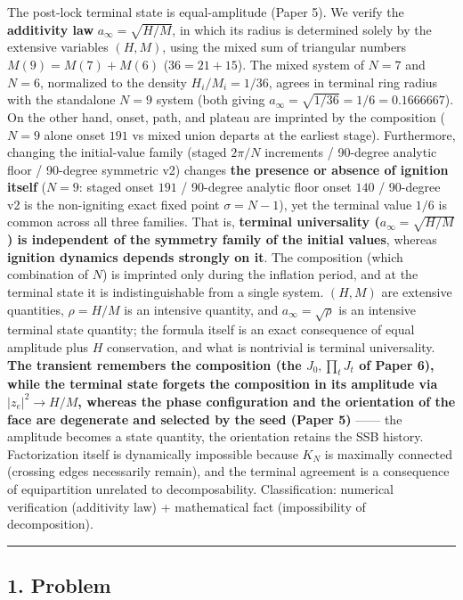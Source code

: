\documentclass[
  a4paper,
]{ltjsarticle}
\begin{document}
The post-lock terminal state is equal-amplitude (Paper 5). We verify the
\textbf{additivity law} \(a_\infty=\sqrt{H/M}\), in which its radius is
determined solely by the extensive variables \((H,M)\), using the mixed
sum of triangular numbers \(M(9)=M(7)+M(6)\) (\(36=21+15\)). The mixed
system of \(N=7\) and \(N=6\), normalized to the density
\(H_i/M_i=1/36\), agrees in terminal ring radius with the standalone
\(N=9\) system (both giving \(a_\infty=\sqrt{1/36}=1/6=0.1666667\)). On
the other hand, onset, path, and plateau are imprinted by the
composition (\(N=9\) alone onset \(191\) vs mixed union departs at the
earliest stage). Furthermore, changing the initial-value family (staged
\(2\pi/N\) increments / 90-degree analytic floor / 90-degree symmetric
v2) changes \textbf{the presence or absence of ignition itself}
(\(N=9\): staged onset \(191\) / 90-degree analytic floor onset \(140\)
/ 90-degree v2 is the non-igniting exact fixed point \(\sigma=N-1\)),
yet the terminal value \(1/6\) is common across all three families. That
is, \textbf{terminal universality (\(a_\infty=\sqrt{H/M}\)) is
independent of the symmetry family of the initial values}, whereas
\textbf{ignition dynamics depends strongly on it}. The composition
(which combination of \(N\)) is imprinted only during the inflation
period, and at the terminal state it is indistinguishable from a single
system. \((H,M)\) are extensive quantities, \(\rho=H/M\) is an intensive
quantity, and \(a_\infty=\sqrt\rho\) is an intensive terminal state
quantity; the formula itself is an exact consequence of equal amplitude
plus \(H\) conservation, and what is nontrivial is terminal
universality. \textbf{The transient remembers the composition (the
\(J_0,\prod_tJ_t\) of Paper 6), while the terminal state forgets the
composition in its amplitude via \(|z_e|^2\to H/M\), whereas the phase
configuration and the orientation of the face are degenerate and
selected by the seed (Paper 5)} ------ the amplitude becomes a state
quantity, the orientation retains the SSB history. Factorization itself
is dynamically impossible because \(K_N\) is maximally connected
(crossing edges necessarily remain), and the terminal agreement is a
consequence of equipartition unrelated to decomposability.
Classification: numerical verification (additivity law) + mathematical
fact (impossibility of decomposition).

\begin{center}\rule{0.5\linewidth}{0.5pt}\end{center}

\subsection{1. Problem}\label{problem}
\end{document}
